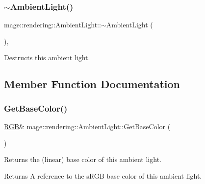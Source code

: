 \subsubsection{\texorpdfstring{$\sim$\+Ambient\+Light()}{~AmbientLight()}}
{\footnotesize\ttfamily mage\+::rendering\+::\+Ambient\+Light\+::$\sim$\+Ambient\+Light (\begin{DoxyParamCaption}{ }\end{DoxyParamCaption})\hspace{0.3cm}{\ttfamily [virtual]}, {\ttfamily [default]}}

Destructs this ambient light. 

\subsection{Member Function Documentation}
\hypertarget{classmage_1_1rendering_1_1_ambient_light_ad4e1f6726b09f690d2abcdfd536d3908}{}\label{classmage_1_1rendering_1_1_ambient_light_ad4e1f6726b09f690d2abcdfd536d3908} 
\subsubsection{\texorpdfstring{Get\+Base\+Color()}{GetBaseColor()}\hspace{0.1cm}{\footnotesize\ttfamily [1/2]}}
{\footnotesize\ttfamily \hyperlink{structmage_1_1_r_g_b}{R\+GB}\& mage\+::rendering\+::\+Ambient\+Light\+::\+Get\+Base\+Color (\begin{DoxyParamCaption}{ }\end{DoxyParamCaption})\hspace{0.3cm}{\ttfamily [noexcept]}}

Returns the (linear) base color of this ambient light.

\begin{DoxyReturn}{Returns}
A reference to the s\+R\+GB base color of this ambient light. 
\end{DoxyReturn}
\hypertarget{classmage_1_1rendering_1_1_ambient_light_a68266fb710e72997d9bb0a02d7f5d416}{}\label{classmage_1_1rendering_1_1_ambient_light_a68266fb710e72997d9bb0a02d7f5d416} 
